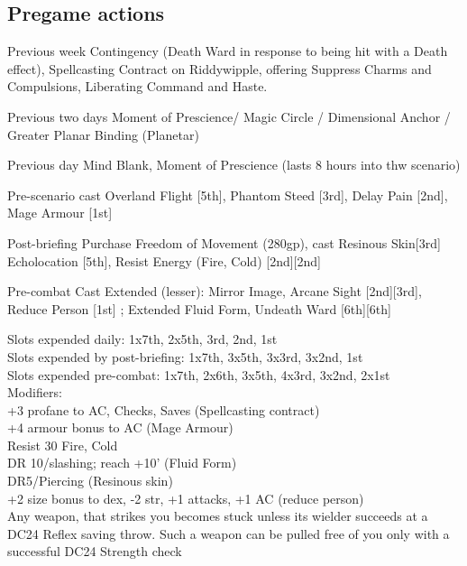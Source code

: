 {\subsection{Pregame actions}
\begin{compactenum}
 \item [Previous week] Contingency (Death Ward in response to being hit with a Death effect), Spellcasting Contract on Riddywipple,
     offering Suppress Charms and Compulsions, Liberating Command and Haste.
 \item [Previous two days]  Moment of Prescience/ Magic Circle / Dimensional Anchor / Greater Planar Binding (Planetar) 
 \item [Previous day] Mind Blank, Moment of Prescience (lasts 8 hours into thw scenario)
 \item [Pre-scenario] cast Overland Flight [5th], Phantom Steed [3rd], Delay Pain [2nd], Mage Armour [1st]
 \item [Post-briefing] Purchase Freedom of Movement (280gp), cast Resinous Skin[3rd] Echolocation [5th], Resist Energy (Fire, Cold) [2nd][2nd]
 \item [Pre-combat] Cast Extended (lesser): Mirror Image, Arcane Sight [2nd][3rd], Reduce Person [1st] ; Extended Fluid Form, Undeath Ward [6th][6th]
\end{compactenum}

Slots expended daily: 1x7th, 2x5th, 3rd, 2nd, 1st \\
Slots expended by post-briefing: 1x7th, 3x5th, 3x3rd, 3x2nd, 1st\\
Slots expended pre-combat: 1x7th, 2x6th, 3x5th, 4x3rd, 3x2nd, 2x1st\\

Modifiers: \\
+3 profane to AC, Checks, Saves (Spellcasting contract)\\
+4 armour bonus to AC (Mage Armour) \\
Resist 30 Fire, Cold \\
DR 10/slashing; reach +10' (Fluid Form) \\
DR5/Piercing (Resinous skin) \\
+2 size bonus to dex, -2 str, +1 attacks, +1 AC (reduce person) \\


Any weapon, that strikes you becomes stuck unless its wielder succeeds at a DC24 Reflex saving throw. Such a weapon can be pulled free of you 
only with a successful DC24 Strength check\\

}
